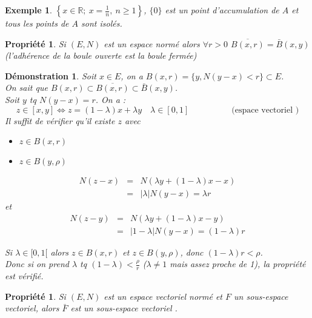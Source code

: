 \documentclass[a4paper, oneside]{report}
\theoremstyle{break}
\newtheorem{propr}[thm]{Propriété}
\newtheorem{exem}[thm]{Exemple}
\newtheorem*{demo}{Démonstration}
\newcommand{\R}{\mathbb{R}}
\newcommand{\sev}{sous-espace vectoriel }
\newcommand{\ev}{espace vectoriel }
\newcommand{\fracun}[1]{\frac{1}{#1}}
\begin{document}
\begin{exem}
$\left\{x\in \R;~x=\fracun{n},~ n \geq 1 \right\}$, $\{0\}$ est un point d'accumulation de $A$ et tous les points de $A$ sont isolés.
\end{exem}



\begin{propr}
\label{prop_1}
Si $(E,N)$ est un espace normé alors $\forall r>0$ $\overline{B(x,r)}=\bar{B}(x,y)$ (l'adhérence de la boule ouverte est la boule fermée)
\end{propr}



\begin{demo}
Soit $x\in E$, on a $B(x,r) = \{y, N(y-x) <r \} \subset E$.\\
On sait que $B(x,r)\subset \overline{B(x,r)}\subset \bar{B}(x,y)$.\\
Soit $y$ tq $N(y-x)=r$.
On a :
$$z\in [x,y] \Leftrightarrow z=(1-\lambda)x+\lambda y\hspace{1em}\lambda \in [0,1]\hspace{5em} \text{(\ev)}$$
Il suffit de vérifier qu'il existe $z$ avec 
\begin{itemize}
\item $z\in B(x,r)$
\item $z\in B(y,\rho)$

\end{itemize}

$$\begin{array}{lll}
N(z-x)&=& N(\lambda y + (1-\lambda)x -x)\\
&=&|\lambda| N(y-x)= \lambda r
\end{array}$$
et
$$\begin{array}{lll}
N(z-y)&=& N(\lambda y + (1-\lambda)x -y)\\
&=&|1- \lambda| N(y-x)= (1-\lambda) r
\end{array}$$

Si $\lambda \in [0,1[$ alors $z\in B(x,r)$ et $z\in B(y,\rho)$, donc $(1-\lambda)r <\rho$.\\
Donc si on prend $\lambda$ tq $(1-\lambda) < \frac{\rho}{r}$ ($\lambda \neq 1$ mais assez proche de 1), la propriété est vérifié.
\end{demo}



\begin{propr}
\label{prop_2}
Si $(E,N)$ est un \ev normé et $F$ un sous-espace vectoriel, alors $\bar{F}$ est un \sev.
\end{propr}
\end{document}
